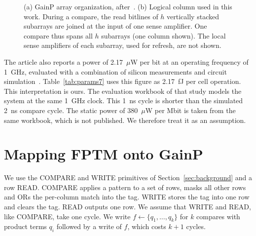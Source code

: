 \documentclass[preprint,review,12pt]{elsarticle}
\newcommand{\gainp}{GainP}
\newcommand{\hyp}[1]{#1}   %
\begin{document}
\begin{figure}[t]
{}
\caption{(a) \gainp{} array organization, after~\cite{levi2026gainp}. (b) Logical column used in this work. During a compare, the read bitlines of $h$ vertically stacked subarrays are joined at the input of one sense amplifier. One compare thus spans all $h$ subarrays (one column shown). The local sense amplifiers of each subarray, used for refresh, are not shown.}
\label{fig:arch}
\end{figure}

The article also reports a power of 2.17~$\mu$W per bit at an operating frequency of 1~GHz, evaluated with a combination of silicon measurements and circuit simulation~\cite{levi2026gainp}. Table~\ref{tab:params7} uses this figure as 2.17~fJ per cell operation. This interpretation is ours.
The evaluation workbook of that study models the system at the same 1~GHz clock. This 1~ns cycle is shorter than the simulated 2~ns compare cycle.
The static power of 380~$\mu$W per Mbit is taken from the same workbook, which is not published. \hyp{We therefore treat it as an assumption.}

\section{Mapping FPTM onto \gainp{}}\label{sec:mapping}

We use the COMPARE and WRITE primitives of Section~\ref{sec:background} and a row READ.
COMPARE applies a pattern to a set of rows, masks all other rows and ORs the per-column match into the tag.
WRITE stores the tag into one row and clears the tag.
READ outputs one row.
\hyp{We assume that WRITE and READ, like COMPARE, take one cycle.}
We write $f \leftarrow \{q_1,\dots,q_k\}$ for $k$ compares with product terms $q_i$ followed by a write of $f$, which costs $k+1$ cycles.
\end{document}

